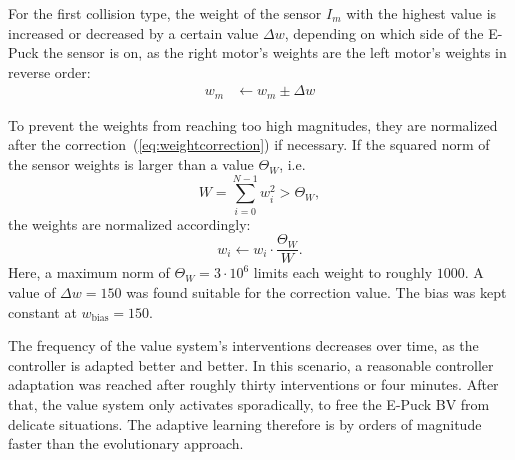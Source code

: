 \documentclass[a4paper]{jacow}
\begin{document}
For the first collision type, the weight of the sensor $I_m$ with the highest value is increased or decreased by a certain value $\Delta w$, depending on which side of the E-Puck the sensor is on, as the right motor's weights are the left motor's weights in reverse order:
\begin{align}
	w_m &\leftarrow w_m \pm \Delta w\label{eq:weightcorrection}
\end{align}

To prevent the weights from reaching too high magnitudes, they are normalized after the correction~(\ref{eq:weightcorrection}) if necessary. If the squared norm of the sensor weights is larger than a value $\Theta_W$, i.e.
\begin{equation}
	W = \sum\limits_{i=0}^{N-1} w_i^2 > \Theta_W,
\end{equation}
the weights are normalized accordingly:
\begin{equation}
	w_i \leftarrow w_i \cdot \frac{\Theta_W}{W}.
\end{equation}
Here, a maximum norm of $\Theta_W=3\cdot 10^6$ limits each weight to roughly $1000$. A value of $\Delta w = 150$ was found suitable for the correction value. The bias was kept constant at $w_\text{bias} = 150$.

The frequency of the value system's interventions decreases over time, as the controller is adapted better and better. In this scenario, a reasonable controller adaptation was reached after roughly thirty interventions or four minutes. After that, the value system only activates sporadically, to free the E-Puck BV from delicate situations. The adaptive learning therefore is by orders of magnitude faster than the evolutionary approach.
\end{document}
